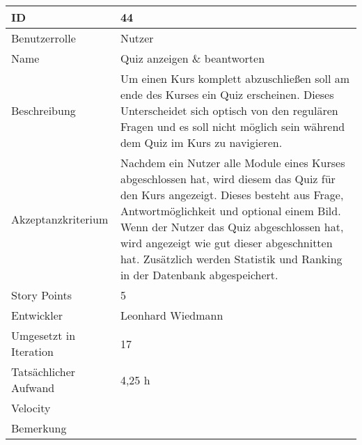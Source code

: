 \begin{tabularx}{\textwidth}{|p{}|X|}
	\hline
	ID & 44\\
	\hline
	Benutzerrolle & Nutzer\\
	\hline
	Name & Quiz anzeigen \& beantworten\\
	\hline
	Beschreibung & Um einen Kurs komplett abzuschließen soll am ende des Kurses ein Quiz erscheinen. Dieses Unterscheidet sich optisch von den regulären Fragen und es soll nicht möglich sein während dem Quiz im Kurs zu navigieren.\\
	\hline
	Akzeptanzkriterium & Nachdem ein Nutzer alle Module eines Kurses abgeschlossen hat, wird diesem das Quiz für den Kurs angezeigt. Dieses besteht aus Frage, Antwortmöglichkeit und optional einem Bild. Wenn der Nutzer das Quiz abgeschlossen hat, wird angezeigt wie gut dieser abgeschnitten hat. Zusätzlich werden Statistik und Ranking in der Datenbank abgespeichert. \\
	\hline
	Story Points & 5\\
	\hline
	Entwickler & Leonhard Wiedmann\\
	\hline
	Umgesetzt in Iteration & 17\\
	\hline
	Tatsächlicher Aufwand & 4,25 h\\
	\hline
	Velocity & \\
	\hline
	Bemerkung & \\
	\hline
\end{tabularx}
\vspace{20pt}
